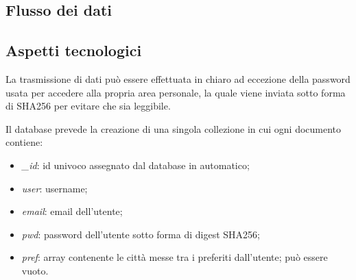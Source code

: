 \subsection{Flusso dei dati}

\subsection{Aspetti tecnologici}

La trasmissione di dati può essere effettuata in chiaro ad eccezione della password usata per accedere alla propria area
personale, la quale viene inviata sotto forma di SHA256 per evitare che sia leggibile.

\vspace{5mm}

Il database prevede la creazione di una singola collezione in cui ogni documento contiene:
\begin{itemize}
    \item \emph{\_id}: id univoco assegnato dal database in automatico;
    \item \emph{user}: username;
    \item \emph{email}: email dell'utente;
    \item \emph{pwd}: password dell'utente sotto forma di digest SHA256;
    \item \emph{pref}: array contenente le città messe tra i preferiti dall'utente; può essere vuoto.
\end{itemize}

\vspace{5mm}


